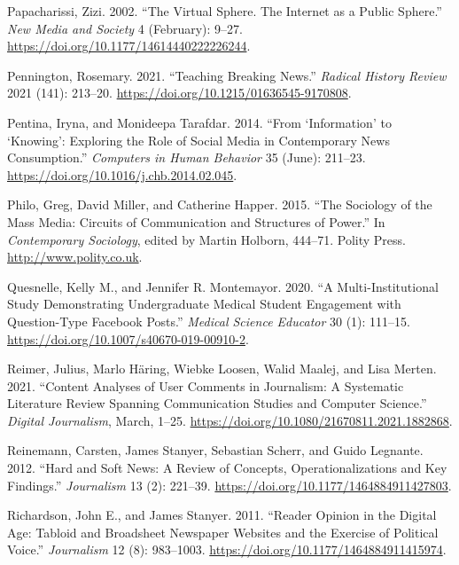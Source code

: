 \documentclass[
]{article}
\newlength{\cslhangindent}
\newlength{\cslentryspacingunit} %
\newenvironment{CSLReferences}[2] %
 {%
  \setlength{\parindent}{0pt}
  \ifodd #1
  \let\oldpar\par
  \def\par{\hangindent=\cslhangindent\oldpar}
  \fi
  \setlength{\parskip}{#2\cslentryspacingunit}
 }%
 {}
\begin{document}
\begin{CSLReferences}{1}{0}
\leavevmode{}%
Papacharissi, Zizi. 2002. {``The {Virtual} {Sphere}. {The} {Internet} as
a {Public} {Sphere}.''} \emph{New Media and Society} 4 (February):
9--27. \url{https://doi.org/10.1177/14614440222226244}.

\leavevmode{}%
Pennington, Rosemary. 2021. {``Teaching {Breaking} {News}.''}
\emph{Radical History Review} 2021 (141): 213--20.
\url{https://doi.org/10.1215/01636545-9170808}.

\leavevmode{}%
Pentina, Iryna, and Monideepa Tarafdar. 2014. {``From {`Information'} to
{`Knowing'}: {Exploring} the Role of Social Media in Contemporary News
Consumption.''} \emph{Computers in Human Behavior} 35 (June): 211--23.
\url{https://doi.org/10.1016/j.chb.2014.02.045}.

\leavevmode{}%
Philo, Greg, David Miller, and Catherine Happer. 2015. {``The Sociology
of the Mass Media: {Circuits} of Communication and Structures of
Power.''} In \emph{Contemporary {Sociology}}, edited by Martin Holborn,
444--71. Polity Press. \url{http://www.polity.co.uk}.

\leavevmode{}%
Quesnelle, Kelly M., and Jennifer R. Montemayor. 2020. {``A
{Multi}-{Institutional} {Study} {Demonstrating} {Undergraduate}
{Medical} {Student} {Engagement} with {Question}-{Type} {Facebook}
{Posts}.''} \emph{Medical Science Educator} 30 (1): 111--15.
\url{https://doi.org/10.1007/s40670-019-00910-2}.

\leavevmode{}%
Reimer, Julius, Marlo Häring, Wiebke Loosen, Walid Maalej, and Lisa
Merten. 2021. {``Content {Analyses} of {User} {Comments} in
{Journalism}: {A} {Systematic} {Literature} {Review} {Spanning}
{Communication} {Studies} and {Computer} {Science}.''} \emph{Digital
Journalism}, March, 1--25.
\url{https://doi.org/10.1080/21670811.2021.1882868}.

\leavevmode{}%
Reinemann, Carsten, James Stanyer, Sebastian Scherr, and Guido Legnante.
2012. {``Hard and Soft News: {A} Review of Concepts, Operationalizations
and Key Findings.''} \emph{Journalism} 13 (2): 221--39.
\url{https://doi.org/10.1177/1464884911427803}.

\leavevmode{}%
Richardson, John E., and James Stanyer. 2011. {``Reader Opinion in the
Digital Age: {Tabloid} and Broadsheet Newspaper Websites and the
Exercise of Political Voice.''} \emph{Journalism} 12 (8): 983--1003.
\url{https://doi.org/10.1177/1464884911415974}.


\end{CSLReferences}
\end{document}
